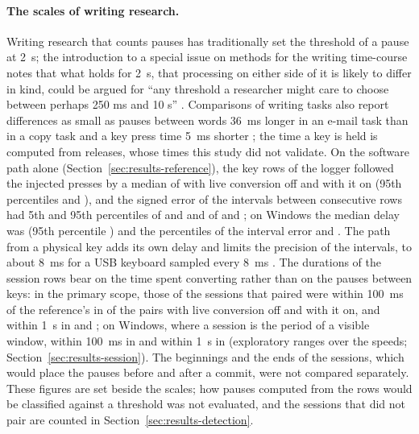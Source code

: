 \paragraph{The scales of writing research.} Writing research that counts pauses has traditionally set the threshold of
a pause at 2~s; the introduction to a special issue on methods for the writing time-course notes that what holds for
2~s, that processing on either side of it is likely to differ in kind, could be argued for ``any threshold a
researcher might care to choose between perhaps 250 ms and 10 s'' \citep{torrance2024}. Comparisons of writing tasks
also report differences as small as pauses between words 36~ms longer in an e-mail task than in a copy task and a key
press time 5~ms shorter \citep[p.~2362]{conijn2019}; the time a key is held is computed
from releases, whose times this study did not validate. On the software path alone
(Section~\ref{sec:results-reference}), the key rows of the logger followed the injected presses by a median of
 with live conversion off and
 with it on (95th percentiles
 and ), and the
signed error of the intervals between consecutive rows had 5th and 95th percentiles of
 and  and of
 and ; on Windows
the median delay was  (95th percentile
) and the percentiles of the interval error
 and . The path from a
physical key adds its own delay and limits the precision of the intervals, to about 8~ms for a USB keyboard sampled
every 8~ms \citep{pinet2017}. The durations of the session rows bear on the time spent converting rather than on the
pauses between keys: in the primary scope, those of the sessions that paired were within 100~ms of the reference's in
 of the pairs with live conversion off and
 with it on, and within 1~s in
 and ; on
Windows, where a session is the period of a visible window, within 100~ms in 
and within 1~s in  (exploratory ranges over the speeds;
Section~\ref{sec:results-session}). The beginnings and the ends of the sessions, which would place the pauses before and
after a commit, were not compared separately. These figures are set beside the scales; how pauses computed from the rows
would be classified against a threshold was not evaluated, and the sessions that did not pair are counted in
Section~\ref{sec:results-detection}.
